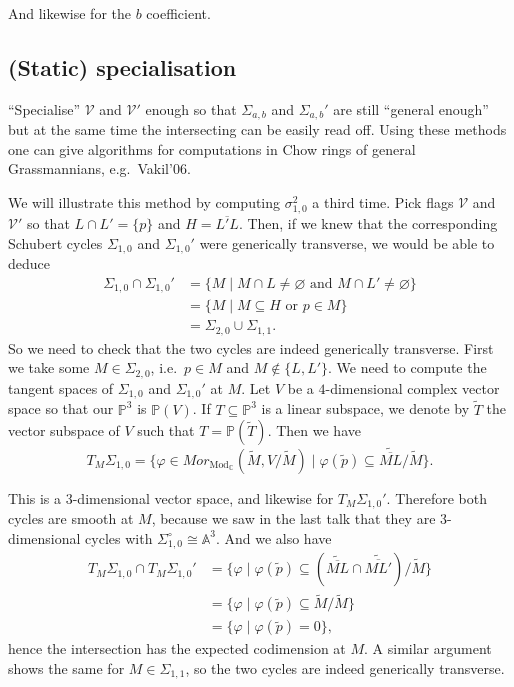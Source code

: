 \documentclass[12pt,a4paper]{amsart}
\theoremstyle{plain}
\theoremstyle{definition}
\theoremstyle{remark}
\begin{document}
And likewise for the $b$ coefficient.

\subsection{(Static) specialisation}

``Specialise'' $\mathcal{V}$ and $\mathcal{V}'$ enough so that  $\Sigma_{a,b}$ and $\Sigma_{a,b}'$ are still ``general enough'' but at the same time the intersecting can be easily read off.
Using these methods one can give algorithms for computations in Chow rings of general Grassmannians, e.g.~Vakil'06.

We will illustrate this method by computing $\sigma_{1,0}^{2}$ a third time.
Pick flags $\mathcal{V}$ and $\mathcal{V}'$ so that $L\cap L'=\{p\}$ and $H=\overline{L'L}$.
Then, if we knew that the corresponding Schubert cycles $\Sigma_{1,0}$ and $\Sigma_{1,0}'$ were generically transverse, we would be able to deduce
\begin{align*}
    \Sigma_{1,0}\cap \Sigma_{1,0}' & = \{ M \mid M\cap L\neq \varnothing \text{ and }M\cap L'\neq \varnothing\} \\
    & = \{ M\mid M\subseteq H \text{ or } p\in M\} \\
    & = \Sigma_{2,0}\cup \Sigma_{1,1}.
\end{align*}
So we need to check that the two cycles are indeed generically transverse.
First we take some $M\in \Sigma_{2,0}$, i.e.~$p\in M$ and $M\not\in \{L,L'\}$.
We need to compute the tangent spaces of $\Sigma_{1,0}$ and $\Sigma_{1,0}'$ at $M$.
Let $V$ be a $4$-dimensional complex vector space so that our $\mathbb{P}^{3}$ is $\mathbb{P}(V)$.
If $T\subseteq \mathbb{P}^{3}$ is a linear subspace, we denote by $\tilde{T}$ the vector subspace of $V$ such that $T=\mathbb{P}(\tilde{T})$.
Then we have
\[ T_{M}\Sigma_{1,0}=\{ \varphi\in Mor_{\operatorname{Mod}_{\mathbb{C}}}(\tilde{M},V/\tilde{M}) \mid \varphi(\tilde{p})\subseteq \tilde{\overline{ML}}/\tilde{M}\}. \]

This is a $3$-dimensional vector space, and likewise for $T_{M}\Sigma_{1,0}'$.
Therefore both cycles are smooth at $M$, because we saw in the last talk that they are $3$-dimensional cycles with $\Sigma_{1,0}^{\circ}\cong \mathbb{A}^{3}$.
And we also have
\begin{align*}
    T_{M}\Sigma_{1,0}\cap T_{M}\Sigma_{1,0}' & = \{\varphi \mid \varphi(\tilde{p})\subseteq (\tilde{\overline{ML}}\cap \tilde{\overline{ML'}})/\tilde{M} \} \\
    & = \{ \varphi \mid\varphi(\tilde{p})\subseteq \tilde{M}/\tilde{M} \} \\
    & = \{ \varphi \mid \varphi(\tilde{p})=0 \},
\end{align*}
hence the intersection has the expected codimension at $M$.
A similar argument shows the same for $M\in \Sigma_{1,1}$, so the two cycles are indeed generically transverse.
\end{document}
